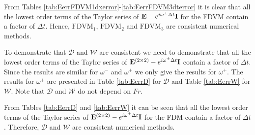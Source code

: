 From Tables \ref{tab:EerrFDVM1dxerror}-\ref{tab:EerrFDVM3dterror} it is clear that all the lowest order terms of the Taylor series of $\mathbf{E}- e^{i\omega^\pm \Delta t } \mathbf{I}$ for the FDVM contain a factor of $\Delta t$. Hence, $\text{FDVM}_1$, $\text{FDVM}_2$ and $\text{FDVM}_3$ are consistent numerical methods.

To demonstrate that $\mathcal{D}$ and $\mathcal{W}$ are consistent we need to demonstrate that all the lowest order terms of the Taylor series of $\mathbf{E}^{\left(2\times 2\right)}- e^{i\omega^\pm \Delta t } \mathbf{I}$ contain a factor of $\Delta t$. Since the results are similar for $\omega^-$ and $\omega^+$ we only give the results for $\omega^+$. The results for $\omega^+$ are presented in Table \ref{tab:EerrD} for $\mathcal{D}$ and Table \ref{tab:EerrW} for $\mathcal{W}$. Note that $\mathcal{D}$ and $\mathcal{W}$ do not depend on $Fr$.

From Tables \ref{tab:EerrD} and \ref{tab:EerrW} it can be seen that all the lowest order terms of the Taylor series of $\mathbf{E}^{\left(2\times 2\right)}- e^{i\omega^\pm \Delta t } \mathbf{I}$ for the FDM contain a factor of $\Delta t$. Therefore, $\mathcal{D}$ and $\mathcal{W}$ are consistent numerical methods. 

